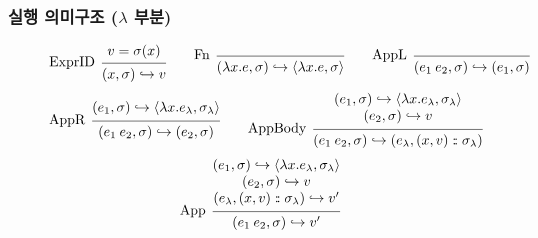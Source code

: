 \documentclass{beamer}
\theoremstyle{definition}
\newcommand*{\cons}{:{\hspace{-0.7em}}:}
\newcommand*{\ctx}{\sigma}
\newcommand*{\semarrow}{\hookrightarrow}
\begin{document}
\begin{frame}[c]
  \frametitle{실행 의미구조 ($\lambda$ 부분)}
  \begin{figure}[t!]
    \scriptsize
    \begin{flushright}
      \fbox{$(e,\ctx)\semarrow V\text{ or }(e',\ctx')$}
    \end{flushright}
    \centering
    \vspace{0pt} %
    \[
      \begin{prooftree}
        \hypo{v=\ctx(x)}
        \infer[left label=ExprID]1{
        (x, \ctx)
        \semarrow
        v
        }
      \end{prooftree}\qquad
      \begin{prooftree}
        \infer[left label=Fn]0{
        (\lambda x.e, \ctx)
        \semarrow
        \langle\lambda x.e, \ctx\rangle
        }
      \end{prooftree}\qquad
      \begin{prooftree}
        \infer[left label={AppL}]0{
        (e_{1}\:e_{2}, \ctx)
        \semarrow
        (e_{1},\ctx)
        }
      \end{prooftree}
    \]
    \[
      \begin{prooftree}
        \hypo{
          \begin{matrix}
            (e_{1}, \ctx)
            \semarrow
            \langle\lambda x.e_{\lambda}, \ctx_{\lambda}\rangle
          \end{matrix}
        }
        \infer[left label={AppR}]1{
        (e_{1}\:e_{2}, \ctx)
        \semarrow
        (e_{2}, \ctx)
        }
      \end{prooftree}\qquad
      \begin{prooftree}
        \hypo{
          \begin{matrix}
            (e_{1}, \ctx)
            \semarrow
            \langle\lambda x.e_{\lambda}, \ctx_{\lambda}\rangle \\
            (e_{2}, \ctx)
            \semarrow
            v
          \end{matrix}
        }
        \infer[left label={AppBody}]1{
        (e_{1}\:e_{2}, \ctx)
        \semarrow
        (e_{\lambda}, (x, v)\cons \ctx_{\lambda})
        }
      \end{prooftree}
    \]
    \[
      \begin{prooftree}
        \hypo{
          \begin{matrix}
            (e_{1}, \ctx)
            \semarrow
            \langle\lambda x.e_{\lambda}, \ctx_{\lambda}\rangle \\
            (e_{2}, \ctx)
            \semarrow
            v                                                   \\
            (e_{\lambda}, (x, v)\cons \ctx_{\lambda})
            \semarrow
            v'
          \end{matrix}
        }
        \infer[left label={App}]1{
        (e_{1}\:e_{2}, \ctx)
        \semarrow
        v'
        }
      \end{prooftree}
    \]
  \end{figure}
\end{frame}
\end{document}
